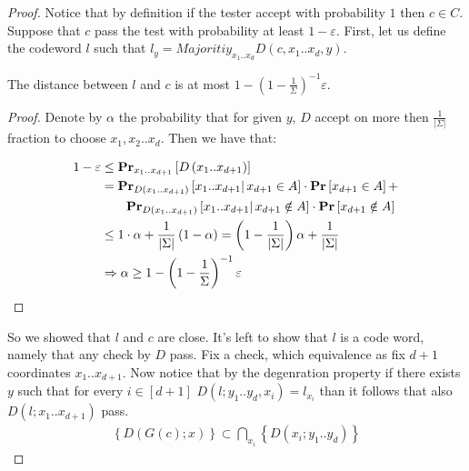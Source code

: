 \begin{proof}
  Notice that by definition if the tester accept with probability $1$ then $c \in C$. Suppose that $c$ pass the test with probability at least $1 - \varepsilon$. First, let us define the codeword $l$ such that $ l_{y} = Majoritiy_{x_1 .. x_{d}}D\left(c, x_{1}.. x_{d},y\right)$.

  \begin{claim} 
    The distance between $l$ and $c$ is at most $ 1- \left( 1 - \frac{1}{\Sigma} \right)^{-1}\varepsilon$.  
  \end{claim}
  \begin{proof} 
    Denote by $\alpha$ the probability that for given $y$, $D$ accept on more then $\frac{1}{|\Sigma|}$ fraction to choose $x_{1},x_{2}..x_{d}$. 
    Then we have that:  
    
    \begin{equation*}
      \begin{split}
        1 - \varepsilon  & \le \prbm{ D\left( x_1 .. x_{d+1} \right) }{x_1 .. x_{d+1}}  \\
        & = \prbcprb{  D\left( x_1 .. x_{d+1} \right)}{ x_1 .. x_{d+1}  }{ x_{d+1} \in A } + \\
        & \ \ \ \ \ \ \prbcprb{ D\left( x_1 .. x_{d+1} \right)}{ x_1 .. x_{d+1}   }{ x_{d+1} \notin A } \\
        & \le 1 \cdot \alpha +  \frac{1}{|\Sigma|}  \left( 1 - \alpha \right) = \left( 1 - \frac{1}{|\Sigma|} \right) \alpha  + \frac{1}{|\Sigma|} \\
       & \Rightarrow \alpha \ge  1- \left( 1 - \frac{1}{\Sigma} \right)^{-1}\varepsilon
      \end{split}
    \end{equation*}
  \end{proof} 

  So we showed that $l$ and $c$ are close. It's left to show that $l$ is a code word, namely that any check by $D$ pass. Fix a check, which equivalence as fix $d+1$ coordinates $x_{1} .. x_{d+1}$. Now notice that by the degenration property if there exists $y$ such that for every $i \in [d+1]$ $D\left(l; y_{1} .. y_{d}, x_{i} \right) = l_{x_{i}}$ than it follows that also $D\left(l; x_{1} .. x_{d+1} \right)$ pass.  
  \begin{equation*}
    \begin{split}
      \left\{ D(G(c) ; x ) \right\} \subset \bigcap_{ x_{i} } \left\{ D\left( x_{i} ; y_{1} .. y_{d} \right)  \right\} 
    \end{split}
  \end{equation*}
\end{proof}

